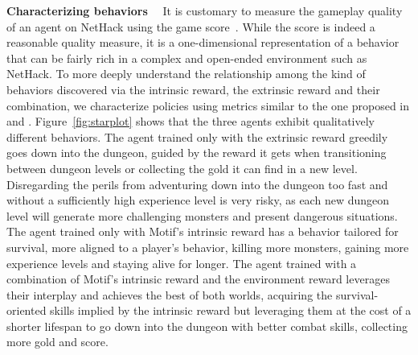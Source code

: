 \documentclass{article} %
\begin{document}
\textbf{Characterizing behaviors}~~
It is customary to measure the gameplay quality of an agent on NetHack using the game score~\citep{KuttlerNMRSGR20,hambro2022insights}.
While the score is indeed a reasonable quality measure, it is a one-dimensional representation of a behavior that can be fairly rich in a complex and open-ended environment such as NetHack.
To more deeply understand the relationship among the kind of behaviors discovered via the intrinsic reward, the extrinsic reward and their combination, we characterize policies using metrics similar to the one proposed in \citet{bruce2023learning} and \citet{piterbarg2023nethack}.
Figure~\ref{fig:starplot} shows that the three agents exhibit qualitatively different behaviors.
The agent trained only with the extrinsic reward greedily goes down into the dungeon, guided by the reward it gets when transitioning between dungeon levels or collecting the gold it can find in a new level. 
Disregarding the perils from adventuring down into the dungeon too fast and without a sufficiently high experience level is very risky, as each new dungeon level will generate more challenging monsters and present dangerous situations.
The agent trained only with Motif's intrinsic reward has a behavior tailored for survival, more aligned to a player's behavior, killing more monsters, gaining more experience levels and staying alive for longer.
The agent trained with a combination of Motif's intrinsic reward and the environment reward leverages their interplay and achieves the best of both worlds, acquiring the survival-oriented skills implied by the intrinsic reward but leveraging them at the cost of a shorter lifespan to go down into the dungeon with better combat skills, collecting more gold and score.
\end{document}
